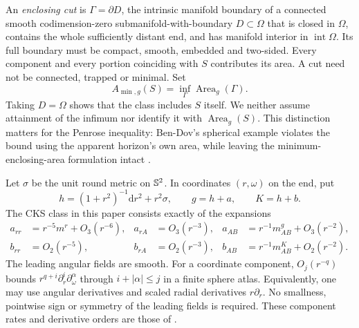 An \emph{enclosing cut} is $\Gamma=\partial D$, the intrinsic manifold
boundary of a connected smooth codimension-zero submanifold-with-boundary
$D\subset\Omega$ that is closed in $\Omega$, contains the whole
sufficiently distant end, and has manifold interior in
$\operatorname{int}\Omega$. Its full boundary must be compact, smooth,
embedded and two-sided. Every component and every portion coinciding
with $S$ contributes its area. A cut need not be connected, trapped or
minimal. Set
\begin{equation}\label{eq:area-definition}
 A_{\min,g}(S)=\inf_\Gamma\operatorname{Area}_g(\Gamma).
\end{equation}
Taking $D=\Omega$ shows that the class includes $S$ itself. We neither
assume attainment of the infimum nor identify it with
$\operatorname{Area}_g(S)$. This distinction matters for the Penrose
inequality: Ben-Dov's spherical example violates the bound using the
apparent horizon's own area, while leaving the minimum-enclosing-area
formulation intact \cite[Sections~1 and~4]{BenDov}.

Let $\sigma$ be the unit round metric on $\mathbb S^2$. In coordinates
$(r,\omega)$ on the end, put
\[
 h=(1+r^2)^{-1}\mathrm dr^2+r^2\sigma,\qquad g=h+a,\qquad K=h+b.
\]
The CKS class in this paper consists exactly of the expansions
\begin{equation}\label{eq:cks}
\begin{aligned}
 a_{rr}&=r^{-5}m^r+O_3(r^{-6}),&a_{rA}&=O_3(r^{-3}),&
 a_{AB}&=r^{-1}m^g_{AB}+O_3(r^{-2}),\\
 b_{rr}&=O_2(r^{-5}),&b_{rA}&=O_2(r^{-3}),&
 b_{AB}&=r^{-1}m^K_{AB}+O_2(r^{-2}).
\end{aligned}
\end{equation}
The leading angular fields are smooth. For a coordinate component,
$O_j(r^{-q})$ bounds $r^{q+i}\partial_r^i\partial_\omega^\alpha$
through $i+|\alpha|\leq j$ in a finite sphere atlas. Equivalently,
one may use angular derivatives and scaled radial derivatives
$r\partial_r$. No smallness, pointwise sign or symmetry of the leading
fields is required. These component rates and derivative orders are
those of \cite[Equations~(2.1)--(2.3)]{CKS}.

